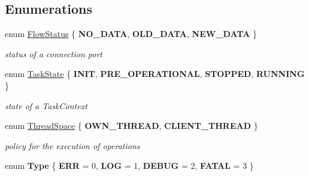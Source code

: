 \subsection*{Enumerations}
\begin{DoxyCompactItemize}
\item 
\hypertarget{namespacecoco_a057be58377e415c9be98c1dc5c8426ad}{}enum \hyperlink{namespacecoco_a057be58377e415c9be98c1dc5c8426ad}{Flow\+Status} \{ {\bfseries N\+O\+\_\+\+D\+A\+T\+A}, 
{\bfseries O\+L\+D\+\_\+\+D\+A\+T\+A}, 
{\bfseries N\+E\+W\+\_\+\+D\+A\+T\+A}
 \}\label{namespacecoco_a057be58377e415c9be98c1dc5c8426ad}

\begin{DoxyCompactList}\small\item\em status of a connection port \end{DoxyCompactList}\item 
\hypertarget{namespacecoco_afec53814046619bac93c2077706a6bd1}{}enum \hyperlink{namespacecoco_afec53814046619bac93c2077706a6bd1}{Task\+State} \{ {\bfseries I\+N\+I\+T}, 
{\bfseries P\+R\+E\+\_\+\+O\+P\+E\+R\+A\+T\+I\+O\+N\+A\+L}, 
{\bfseries S\+T\+O\+P\+P\+E\+D}, 
{\bfseries R\+U\+N\+N\+I\+N\+G}
 \}\label{namespacecoco_afec53814046619bac93c2077706a6bd1}

\begin{DoxyCompactList}\small\item\em state of a Task\+Context \end{DoxyCompactList}\item 
\hypertarget{namespacecoco_ada9a67964012e198cdc20a86ae7cbdd5}{}enum \hyperlink{namespacecoco_ada9a67964012e198cdc20a86ae7cbdd5}{Thread\+Space} \{ {\bfseries O\+W\+N\+\_\+\+T\+H\+R\+E\+A\+D}, 
{\bfseries C\+L\+I\+E\+N\+T\+\_\+\+T\+H\+R\+E\+A\+D}
 \}\label{namespacecoco_ada9a67964012e198cdc20a86ae7cbdd5}

\begin{DoxyCompactList}\small\item\em policy for the execution of operations \end{DoxyCompactList}\item 
\hypertarget{namespacecoco_afc5419a918db396b1efb0b0cedaa7651}{}enum {\bfseries Type} \{ {\bfseries E\+R\+R} = 0, 
{\bfseries L\+O\+G} = 1, 
{\bfseries D\+E\+B\+U\+G} = 2, 
{\bfseries F\+A\+T\+A\+L} = 3
 \}\label{namespacecoco_afc5419a918db396b1efb0b0cedaa7651}

\end{DoxyCompactItemize}
